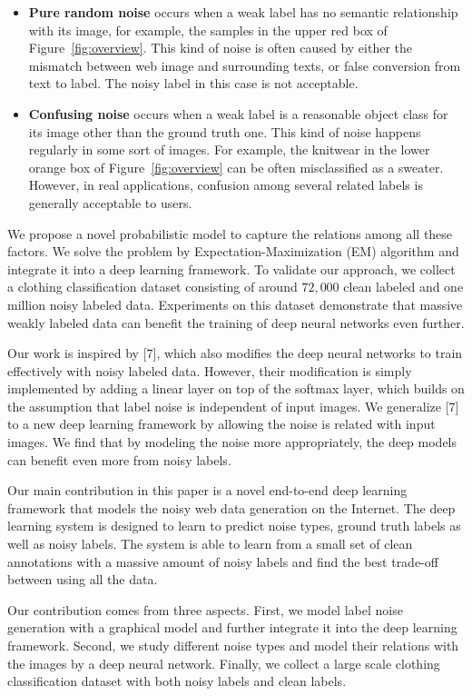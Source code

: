 \documentclass[10pt,twocolumn,letterpaper]{article}
\begin{document}
\begin{itemize}
   \item \textbf{Pure random noise} occurs when a weak label has no semantic relationship with its image, for example, the samples in the upper red box of Figure~\ref{fig:overview}. This kind of noise is often caused by either the mismatch between web image and surrounding texts, or false conversion from text to label. The noisy label in this case is not acceptable.
   \item \textbf{Confusing noise} occurs when a weak label is a reasonable object class for its image other than the ground truth one. This kind of noise happens regularly in some sort of images. For example, the knitwear in the lower orange box of Figure~\ref{fig:overview} can be often misclassified as a sweater. However, in real applications, confusion among several related labels is generally acceptable to users.
\end{itemize}

We propose a novel probabilistic model to capture the relations among all these factors. We solve the problem by Expectation-Maximization (EM) algorithm and integrate it into a deep learning framework. To validate our approach, we collect a clothing classification dataset consisting of around $72,000$ clean labeled and one million noisy labeled data. Experiments on this dataset demonstrate that massive weakly labeled data can benefit the training of deep neural networks even further.

Our work is inspired by [7], which also modifies the deep neural networks to train effectively with noisy labeled data. However, their modification is simply implemented by adding a linear layer on top of the softmax layer, which builds on the assumption that label noise is independent of input images. We generalize [7] to a new deep learning framework by allowing the noise is related with input images. We find that by modeling the noise more appropriately, the deep models can benefit even more from noisy labels.

Our main contribution in this paper is a novel end-to-end deep learning framework that models the noisy web data generation on the Internet. The deep learning system is designed to learn to predict noise types, ground truth labels as well as noisy labels. The system is able to learn from a small set of clean annotations with a massive amount of noisy labels and find the best trade-off between using all the data. 

Our contribution comes from three aspects. First, we model label noise generation with a graphical model and further integrate it into the deep learning framework. Second, we study different noise types and model their relations with the images by a deep neural network. Finally, we collect a large scale clothing classification dataset with both noisy labels and clean labels. 
\end{document}

